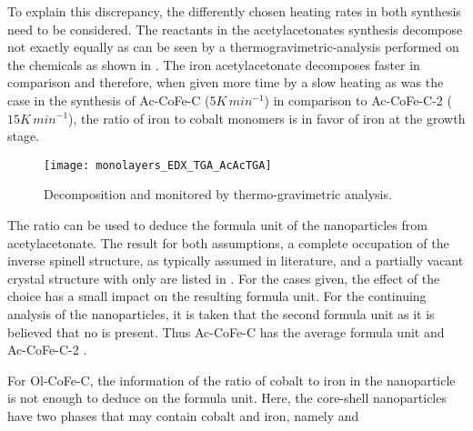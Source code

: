 \documentclass[\main/dresen_thesis.tex]{subfiles}
\begin{document}
  To explain this discrepancy, the differently chosen heating rates in both synthesis need to be considered.
  The reactants in the acetylacetonates synthesis decompose not exactly equally as can be seen by a thermogravimetric-analysis performed on the chemicals as shown in .
  The iron acetylacetonate decomposes faster in comparison and therefore, when given more time by a slow heating as was the case in the synthesis of Ac-CoFe-C ($5 \unit{K \, min^{-1}}$) in comparison to Ac-CoFe-C-2  ($15 \unit{K \, min^{-1}}$), the ratio of iron to cobalt monomers is in favor of iron at the growth stage.
  \begin{figure}[tb]
    \centering
    \texttt{[image: monolayers\_EDX\_TGA\_AcAcTGA]}
    \caption{\label{fig:monolayers:nanoparticle:edx:TGARefluxAcAc}Decomposition   and  monitored by thermo-gravimetric analysis.}
  \end{figure}

  The ratio can be used to deduce the formula unit of the nanoparticles from acetylacetonate.
  The result for both assumptions, a complete occupation of the inverse spinell structure, as typically assumed in literature, and a partially vacant crystal structure with only  are listed in .
  For the cases given, the effect of the choice has a small impact on the resulting formula unit.
  For the continuing analysis of the nanoparticles, it is taken that the second formula unit as it is believed that no  is present.
  Thus Ac-CoFe-C has the average formula unit  and Ac-CoFe-C-2 .

  For Ol-CoFe-C, the information of the ratio of cobalt to iron in the nanoparticle is not enough to deduce on the formula unit. Here, the core-shell nanoparticles have two phases that may contain cobalt and iron, namely  and 
\end{document}
